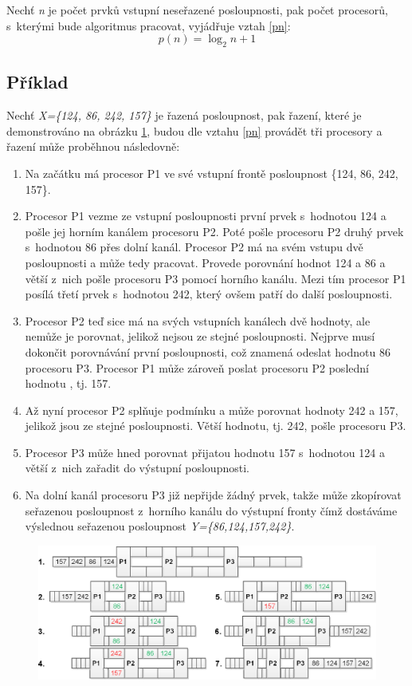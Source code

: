 \documentclass[10pt,a4paper,notitlepage]{article}
\begin{document}
Nechť \textit{n} je počet prvků vstupní neseřazené posloupnosti, pak počet
procesorů, s~kterými bude algoritmus pracovat, vyjádřuje vztah \ref{pn}:
\begin{equation} \label{pn}
  p(n) = \log_{2}n+1
\end{equation}
 
\subsection{Příklad}
Nechť \textit{X=\{124, 86, 242, 157\}} je řazená posloupnost, pak řazení, které
je demonstrováno na obrázku \ref{pic:2}, budou dle vztahu \ref{pn} provádět tři
procesory a řazení může proběhnou následovně:

\begin{enumerate}
  \item Na začátku má procesor P1 ve své vstupní frontě posloupnost \{124, 86, 242, 157\}.
  \item Procesor P1 vezme ze vstupní posloupnosti první prvek s~hodnotou 124 a pošle jej
    horním kanálem procesoru P2. Poté pošle procesoru P2 druhý prvek s~hodnotou 86 přes
    dolní kanál.  Procesor P2 má na svém vstupu dvě posloupnosti a může tedy
    pracovat. Provede porovnání hodnot 124 a 86 a větší z~nich pošle procesoru
    P3 pomocí horního kanálu. Mezi tím procesor P1 posílá třetí prvek s~hodnotou 242,
    který ovšem patří do další posloupnosti.
  \item Procesor P2 teď sice má na svých vstupních kanálech dvě hodnoty, ale
    nemůže je porovnat, jelikož nejsou ze stejné posloupnosti. Nejprve musí
    dokončit porovnávání první posloupnosti, což znamená odeslat hodnotu 86
    procesoru P3.  Procesor P1 může zároveň poslat procesoru P2 poslední hodnotu
    , tj. 157.
  \item Až nyní procesor P2 splňuje podmínku a může porovnat hodnoty 242 a 157,
    jelikož jsou ze stejné posloupnosti. Větší hodnotu, tj. 242, pošle procesoru P3.
  \item Procesor P3 může hned porovnat přijatou hodnotu 157 s~hodnotou 124 a
    větší z~nich zařadit do výstupní posloupnosti.
  \item Na dolní kanál procesoru P3 již nepřijde žádný prvek, takže může
    zkopírovat seřazenou posloupnost z~horního kanálu do výstupní fronty čímž
    dostáváme výslednou seřazenou posloupnost \textit{Y=\{86,124,157,242\}}.
\end{enumerate}

\begin{figure}[h]
	\centering
	\includegraphics{prl-pms.eps}
  \label{pic:2}
\end{figure}
\end{document}
